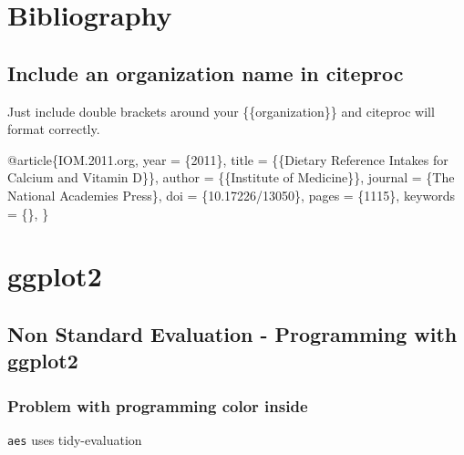 \documentclass[
  letterpaper,
  DIV=11,
  numbers=noendperiod]{scrreprt}
\newenvironment{Shaded}{\begin{snugshade}}{\end{snugshade}}
\newcommand{\NormalTok}[1]{\textcolor[rgb]{0.00,0.23,0.31}{#1}}
\begin{document}

\hypertarget{bibliography}{%
\chapter{Bibliography}\label{bibliography}}

\hypertarget{include-an-organization-name-in-citeproc}{%
\section{Include an organization name in
citeproc}\label{include-an-organization-name-in-citeproc}}

Just include double brackets around your \{\{organization\}\} and
citeproc will format correctly.

\begin{Shaded}
\begin{Highlighting}[]
\NormalTok{@article\{IOM.2011.org,}
\NormalTok{year = \{2011\},}
\NormalTok{title = \{\{Dietary Reference Intakes for Calcium and Vitamin D\}\},}
\NormalTok{author = \{\{Institute of Medicine\}\},}
\NormalTok{journal = \{The National Academies Press\},}
\NormalTok{doi = \{10.17226/13050\},}
\NormalTok{pages = \{1115\},}
\NormalTok{keywords = \{\},}
\NormalTok{\}}
\end{Highlighting}
\end{Shaded}


\hypertarget{ggplot2}{%
\chapter{ggplot2}\label{ggplot2}}

\hypertarget{non-standard-evaluation---programming-with-ggplot2}{%
\section{Non Standard Evaluation - Programming with
ggplot2}\label{non-standard-evaluation---programming-with-ggplot2}}

\hypertarget{problem-with-programming-color-inside}{%
\subsection{Problem with programming color
inside}\label{problem-with-programming-color-inside}}

\texttt{aes} uses tidy-evaluation
\end{document}
